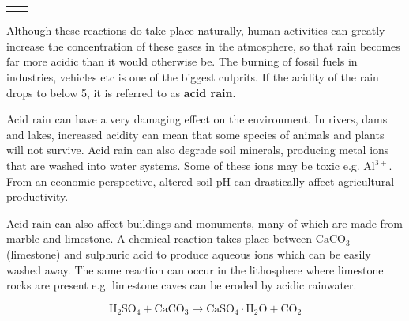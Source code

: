 \begin{enumerate}[noitemsep, label=\textbf{\arabic*}. ]
\begin{definition}
\begin{tabular*}{15 cm}{m{15 mm}m{}}
{         } 
      \end{tabular*}
      \end{definition}
\label{m38720*id338300}Although these reactions do take place naturally, human activities can greatly increase the concentration of these gases in the atmosphere, so that rain becomes far more acidic than it would otherwise be. The burning of fossil fuels in industries, vehicles etc is one of the biggest culprits. If the acidity of the rain drops to below 5, it is referred to as \textbf{acid rain}.\par 
        \label{m38720*id338311}Acid rain can have a very damaging effect on the environment. In rivers, dams and lakes, increased acidity can mean that some species of animals and plants will not survive. Acid rain can also degrade soil minerals, producing metal ions that are washed into water systems. Some of these ions may be toxic e.g. ${\mathrm{Al}}^{3+}$. From an economic perspective, altered soil pH can drastically affect agricultural productivity.\par 
        \label{m38720*id338337}Acid rain can also affect buildings and monuments, many of which are made from marble and limestone. A chemical reaction takes place between ${\mathrm{CaCO}}_{3}$ (limestone) and sulphuric acid to produce aqueous ions which can be easily washed away. The same reaction can occur in the lithosphere where limestone rocks are present e.g. limestone caves can be eroded by acidic rainwater.
        \label{m38720*id7435}\nopagebreak\noindent{}
        
    \begin{equation}
    {\mathrm{H}}_{2}{\mathrm{SO}}_{4}+{\mathrm{CaCO}}_{3}\to {\mathrm{CaSO}}_{4}\ensuremath{\cdot}\mathrm{H}{}_{2}\mathrm{O}+{\mathrm{CO}}_{2}\tag{17.2}
      \end{equation}
\par 
\end{enumerate}
    \label{m38720*cid7}
